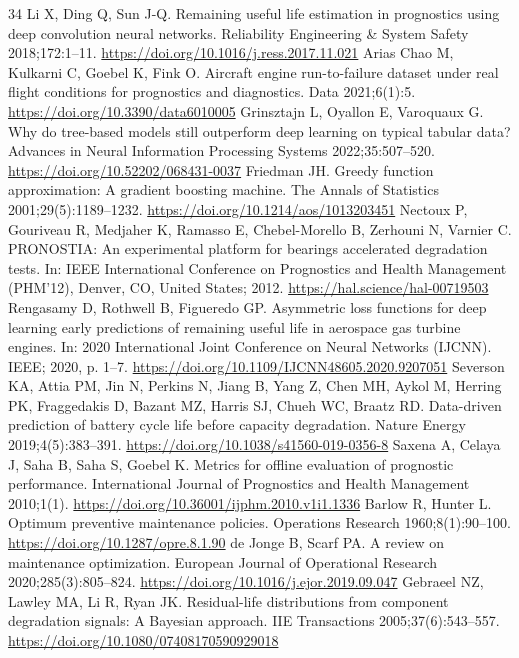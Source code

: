 \documentclass[a4paper,fleqn,doubleblind]{cas-dc}
\begin{document}
\begin{thebibliography}{34}
 Li X, Ding Q, Sun J-Q. Remaining useful life estimation in prognostics using deep convolution neural networks. Reliability Engineering \& System Safety 2018;172:1--11. \url{https://doi.org/10.1016/j.ress.2017.11.021}
 Arias Chao M, Kulkarni C, Goebel K, Fink O. Aircraft engine run-to-failure dataset under real flight conditions for prognostics and diagnostics. Data 2021;6(1):5. \url{https://doi.org/10.3390/data6010005}
 Grinsztajn L, Oyallon E, Varoquaux G. Why do tree-based models still outperform deep learning on typical tabular data? Advances in Neural Information Processing Systems 2022;35:507--520. \url{https://doi.org/10.52202/068431-0037}
 Friedman JH. Greedy function approximation: A gradient boosting machine. The Annals of Statistics 2001;29(5):1189--1232. \url{https://doi.org/10.1214/aos/1013203451}
 Nectoux P, Gouriveau R, Medjaher K, Ramasso E, Chebel-Morello B, Zerhouni N, Varnier C. PRONOSTIA: An experimental platform for bearings accelerated degradation tests. In: IEEE International Conference on Prognostics and Health Management (PHM'12), Denver, CO, United States; 2012. \url{https://hal.science/hal-00719503}
 Rengasamy D, Rothwell B, Figueredo GP. Asymmetric loss functions for deep learning early predictions of remaining useful life in aerospace gas turbine engines. In: 2020 International Joint Conference on Neural Networks (IJCNN). IEEE; 2020, p. 1--7. \url{https://doi.org/10.1109/IJCNN48605.2020.9207051}
 Severson KA, Attia PM, Jin N, Perkins N, Jiang B, Yang Z, Chen MH, Aykol M, Herring PK, Fraggedakis D, Bazant MZ, Harris SJ, Chueh WC, Braatz RD. Data-driven prediction of battery cycle life before capacity degradation. Nature Energy 2019;4(5):383--391. \url{https://doi.org/10.1038/s41560-019-0356-8}
 Saxena A, Celaya J, Saha B, Saha S, Goebel K. Metrics for offline evaluation of prognostic performance. International Journal of Prognostics and Health Management 2010;1(1). \url{https://doi.org/10.36001/ijphm.2010.v1i1.1336}
 Barlow R, Hunter L. Optimum preventive maintenance policies. Operations Research 1960;8(1):90--100. \url{https://doi.org/10.1287/opre.8.1.90}
 de Jonge B, Scarf PA. A review on maintenance optimization. European Journal of Operational Research 2020;285(3):805--824. \url{https://doi.org/10.1016/j.ejor.2019.09.047}
 Gebraeel NZ, Lawley MA, Li R, Ryan JK. Residual-life distributions from component degradation signals: A Bayesian approach. IIE Transactions 2005;37(6):543--557. \url{https://doi.org/10.1080/07408170590929018}

\end{thebibliography}
\end{document}
